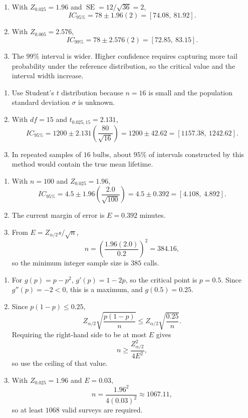 \begin{solproblema}[prob:39c2251]
\begin{enumerate}[label=(\alph*)]
	\item With $Z_{0.025}=1.96$ and $\operatorname{SE}=12/\sqrt{36}=2$,
	\[
		IC_{95\%}=78\pm1.96(2)=[74.08,\ 81.92].
	\]
	\item With $Z_{0.005}=2.576$,
	\[
		IC_{99\%}=78\pm2.576(2)=[72.85,\ 83.15].
	\]
	\item The $99\%$ interval is wider. Higher confidence requires capturing more tail probability under the reference distribution, so the critical value and the interval width increase.
\end{enumerate}
\end{solproblema}

\begin{solproblema}[prob:8fd99c8]
\begin{enumerate}[label=(\alph*)]
	\item Use Student's $t$ distribution because $n=16$ is small and the population standard deviation $\sigma$ is unknown.
	\item With $df=15$ and $t_{0.025,15}=2.131$,
	\[
		IC_{95\%}=1200\pm2.131\left(\frac{80}{\sqrt{16}}\right)
		=1200\pm42.62=[1157.38,\ 1242.62].
	\]
	\item In repeated samples of $16$ bulbs, about $95\%$ of intervals constructed by this method would contain the true mean lifetime.
\end{enumerate}
\end{solproblema}

\begin{solproblema}[prob:6af5954]
\begin{enumerate}[label=(\alph*)]
	\item With $n=100$ and $Z_{0.025}=1.96$,
	\[
		IC_{95\%}=4.5\pm1.96\left(\frac{2.0}{\sqrt{100}}\right)
		=4.5\pm0.392=[4.108,\ 4.892].
	\]
	\item The current margin of error is $E=0.392$ minutes.
	\item From $E=Z_{\alpha/2}s/\sqrt n$,
	\[
		n=\left(\frac{1.96(2.0)}{0.2}\right)^2=384.16,
	\]
	so the minimum integer sample size is $385$ calls.
\end{enumerate}
\end{solproblema}

\begin{solproblema}[prob:0257f5f]
\begin{enumerate}[label=(\alph*)]
	\item For $g(p)=p-p^2$, $g'(p)=1-2p$, so the critical point is $p=0.5$. Since $g''(p)=-2<0$, this is a maximum, and $g(0.5)=0.25$.
	\item Since $p(1-p)\le0.25$,
	\[
		Z_{\alpha/2}\sqrt{\frac{p(1-p)}n}\le
		Z_{\alpha/2}\sqrt{\frac{0.25}{n}}.
	\]
	Requiring the right-hand side to be at most $E$ gives
	\[
		n\ge\frac{Z_{\alpha/2}^2}{4E^2},
	\]
	so use the ceiling of that value.
	\item With $Z_{0.025}=1.96$ and $E=0.03$,
	\[
		n=\frac{1.96^2}{4(0.03)^2}\approx1067.11,
	\]
	so at least $1068$ valid surveys are required.
\end{enumerate}
\end{solproblema}

